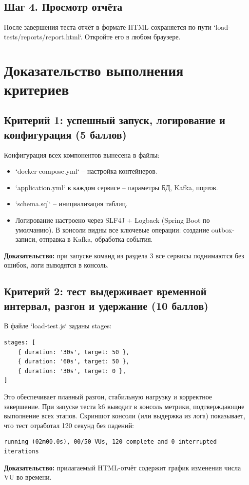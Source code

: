 \documentclass[12pt,a4paper]{article}
\begin{document}
\subsection{Шаг 4. Просмотр отчёта}
После завершения теста отчёт в формате HTML сохраняется по пути `load-tests/reports/report.html`. Откройте его в любом браузере.

\section{Доказательство выполнения критериев}
\subsection{Критерий 1: успешный запуск, логирование и конфигурация (5 баллов)}
Конфигурация всех компонентов вынесена в файлы:
\begin{itemize}
    \item `docker-compose.yml` – настройка контейнеров.
    \item `application.yml` в каждом сервисе – параметры БД, Kafka, портов.
    \item `schema.sql` – инициализация таблиц.
    \item Логирование настроено через SLF4J + Logback (Spring Boot по умолчанию). В консоли видны все ключевые операции: создание outbox-записи, отправка в Kafka, обработка события.
\end{itemize}
\textbf{Доказательство:} при запуске команд из раздела 3 все сервисы поднимаются без ошибок, логи выводятся в консоль.

\subsection{Критерий 2: тест выдерживает временной интервал, разгон и удержание (10 баллов)}
В файле `load-test.js` заданы stages:
\begin{verbatim}
stages: [
    { duration: '30s', target: 50 },
    { duration: '60s', target: 50 },
    { duration: '30s', target: 0 },
]
\end{verbatim}
Это обеспечивает плавный разгон, стабильную нагрузку и корректное завершение. При запуске теста k6 выводит в консоль метрики, подтверждающие выполнение всех этапов.  
Скриншот консоли (или выдержка из лога) показывает, что тест отработал 120 секунд без падений:
\begin{verbatim}
running (02m00.0s), 00/50 VUs, 120 complete and 0 interrupted iterations
\end{verbatim}
\textbf{Доказательство:} прилагаемый HTML-отчёт содержит график изменения числа VU во времени.
\end{document}
